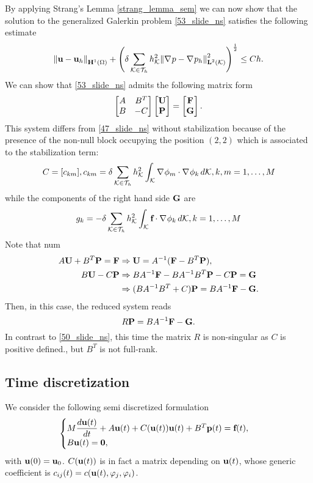 By applying Strang's Lemma \eqref{strang_lemma_sem} we can now show that the solution to the generalized Galerkin problem \eqref{53_slide_ns} satisfies the following estimate 
\[
    \norm{\textbf{u} - \textbf{u}_h}_{\textbf{H}^1(\Omega)} + \left( \delta \sum_{\mathcal{K}\in\mathcal{T}_h} h^2_{\mathcal{K}} \norm{\nabla\mspace{1mu} p - \nabla\mspace{1mu} p_h}_{\textbf{L}^2(\mathcal{K})}^2 \right)^{\frac{1}{2}} \leq Ch.
\]
We can show that \eqref{53_slide_ns} admits the following matrix form
\begin{equation}
    \left[ \begin{matrix}
        A & B^T \\
        B & -C
    \end{matrix} \right] \left[ \begin{matrix}
        \textbf{U} \\ \textbf{P}
    \end{matrix} \right] = \left[ \begin{matrix}
        \textbf{F} \\ \textbf{G}
    \end{matrix} \right].
    \label{56_slide_ns}
\end{equation}
This system differs from \eqref{47_slide_ns} without stabilization because of the presence of the non-null block occupying the position \((2,2)\) which is associated to the stabilization term:
\[
    C = [c_{km}], c_{km} = \delta \sum_\eit h^2_\element \int_\element \grad \oldphi_m \cdot \grad \oldphi_k \, d\element, k,m = 1,\ldots, M
\]
while the components of the right hand side \(\textbf{G}\) are 
\[
    g_k = -\delta \sum_\eit h^2_\element \int_\element \vect{f} \cdot \grad \oldphi_k \, d\element, k = 1,\ldots, M
\]
Note that num
\begin{align}
    A\textbf{U} + B^T\textbf{P} = \textbf{F} &\Rightarrow \textbf{U} = A^{-1} (\textbf{F} - B^T\textbf{P}),\\
    B\textbf{U} - C\textbf{P} & \Rightarrow BA^{-1} \textbf{F} - BA^{-1}B^T \textbf{P} -C\textbf{P} = \textbf{G} \\
    &\Rightarrow (BA^{-1}B^T + C)\textbf{P} = BA^{-1} \textbf{F} - \textbf{G}.
\end{align}
Then, in this case, the reduced system reads 
\[
    R\textbf{P} = BA^{-1} \textbf{F} - \textbf{G}.
\]
In contrast to \eqref{50_slide_ns}, this time the matrix \(R\) is non-singular as \(C\) is positive defined., but \(B^T\) is not full-rank.
\subsection{Time discretization}
We consider the following semi discretized formulation
\begin{equation}
    \begin{cases}
        M\dfrac{d\textbf{u}(t)}{dt} + A\textbf{u}(t) + C(\textbf{u}(t))\textbf{u}(t) + B^T\textbf{p}(t) = \textbf{f}(t) ,\\
        B\textbf{u}(t) = \textbf{0},
        \label{58_slide_ns}
    \end{cases}
\end{equation}
with \(\textbf{u}(0) = \textbf{u}_0\). \(C(\textbf{u}(t))\) is in fact a matrix depending on \(\textbf{u}(t)\), whose generic coefficient is \(c_{ij}(t) = c(\textbf{u}(t), \varphi_j, \varphi_i)\).

